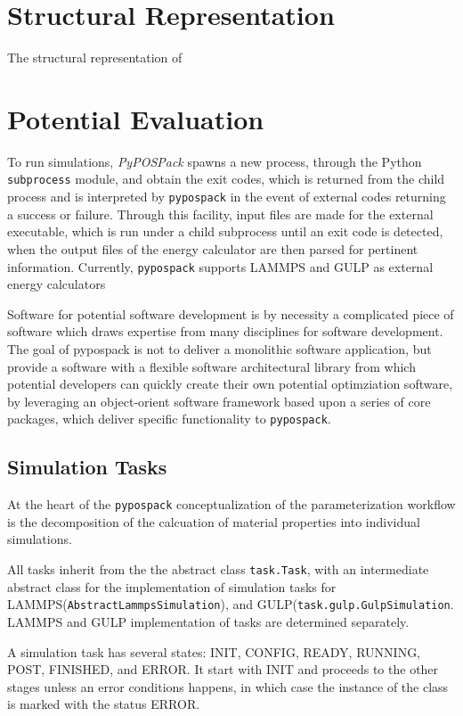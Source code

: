 \section{Structural Representation}

The structural representation of 

\section{Potential Evaluation}
\label{sec:potential_evalaution}

To run simulations, \emph{PyPOSPack} spawns a new process, through the Python \verb|subprocess| module, and obtain the exit codes, which is returned from the child process and is interpreted by \verb|pypospack| in the event of external codes returning a success or failure.  Through this facility, input files are made for the external executable, which is run under a child subprocess until an exit code is detected, when the output files of the energy calculator are then parsed for pertinent information.  Currently, \verb|pypospack| supports LAMMPS and GULP as external energy calculators

Software for potential software development is by necessity a complicated piece of software which draws expertise from many disciplines for software development.  The goal of pypospack is not to deliver a monolithic software application, but provide a software with a flexible software architectural library from which potential developers can quickly create their own potential optimziation software, by leveraging an object-orient software framework based upon a series of core packages, which deliver specific functionality to \verb|pypospack|.


\subsection{Simulation Tasks}
At the heart of the \verb|pypospack| conceptualization of the parameterization workflow is the decomposition of the calcuation of material properties into individual simulations.

All tasks inherit from the the abstract class \verb|task.Task|, with an intermediate abstract class for the implementation of simulation tasks for LAMMPS(\verb|AbstractLammpsSimulation|), and GULP(\verb|task.gulp.GulpSimulation|.  LAMMPS and GULP implementation of tasks are determined separately.

A simulation task has several states: INIT, CONFIG, READY, RUNNING, POST, FINISHED, and ERROR.  It start with INIT and proceeds to the other stages unless an error conditions happens, in which case the instance of the class is marked with the status ERROR.

